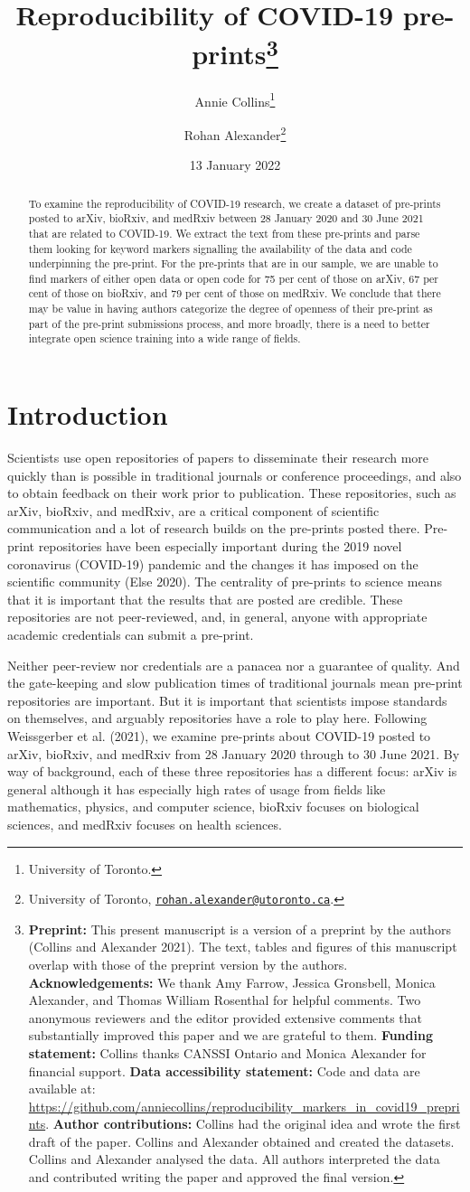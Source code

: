\documentclass[
]{article}
\title{Reproducibility of COVID-19 pre-prints\thanks{\textbf{Preprint:} This present manuscript is a version of a preprint by the authors (Collins and Alexander 2021). The text, tables and figures of this manuscript overlap with those of the preprint version by the authors. \textbf{Acknowledgements:} We thank Amy Farrow, Jessica Gronsbell, Monica Alexander, and Thomas William Rosenthal for helpful comments. Two anonymous reviewers and the editor provided extensive comments that substantially improved this paper and we are grateful to them. \textbf{Funding statement:} Collins thanks CANSSI Ontario and Monica Alexander for financial support. \textbf{Data accessibility statement:} Code and data are available at: \url{https://github.com/anniecollins/reproducibility_markers_in_covid19_preprints}. \textbf{Author contributions:} Collins had the original idea and wrote the first draft of the paper. Collins and Alexander obtained and created the datasets. Collins and Alexander analysed the data. All authors interpreted the data and contributed writing the paper and approved the final version.}}
\author{Annie Collins\footnote{University of Toronto.} \and Rohan Alexander\footnote{University of Toronto, \href{mailto:rohan.alexander@utoronto.ca}{\nolinkurl{rohan.alexander@utoronto.ca}}.}}
\date{13 January 2022}
\begin{document}
\maketitle
\begin{abstract}
To examine the reproducibility of COVID-19 research, we create a dataset of pre-prints posted to arXiv, bioRxiv, and medRxiv between 28 January 2020 and 30 June 2021 that are related to COVID-19. We extract the text from these pre-prints and parse them looking for keyword markers signalling the availability of the data and code underpinning the pre-print. For the pre-prints that are in our sample, we are unable to find markers of either open data or open code for 75 per cent of those on arXiv, 67 per cent of those on bioRxiv, and 79 per cent of those on medRxiv. We conclude that there may be value in having authors categorize the degree of openness of their pre-print as part of the pre-print submissions process, and more broadly, there is a need to better integrate open science training into a wide range of fields.
\end{abstract}

\hypertarget{introduction}{%
\section{Introduction}\label{introduction}}

Scientists use open repositories of papers to disseminate their research more quickly than is possible in traditional journals or conference proceedings, and also to obtain feedback on their work prior to publication. These repositories, such as arXiv, bioRxiv, and medRxiv, are a critical component of scientific communication and a lot of research builds on the pre-prints posted there. Pre-print repositories have been especially important during the 2019 novel coronavirus (COVID-19) pandemic and the changes it has imposed on the scientific community (Else 2020). The centrality of pre-prints to science means that it is important that the results that are posted are credible. These repositories are not peer-reviewed, and, in general, anyone with appropriate academic credentials can submit a pre-print.

Neither peer-review nor credentials are a panacea nor a guarantee of quality. And the gate-keeping and slow publication times of traditional journals mean pre-print repositories are important. But it is important that scientists impose standards on themselves, and arguably repositories have a role to play here. Following Weissgerber et al. (2021), we examine pre-prints about COVID-19 posted to arXiv, bioRxiv, and medRxiv from 28 January 2020 through to 30 June 2021. By way of background, each of these three repositories has a different focus: arXiv is general although it has especially high rates of usage from fields like mathematics, physics, and computer science, bioRxiv focuses on biological sciences, and medRxiv focuses on health sciences.
\end{document}
